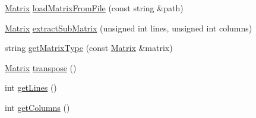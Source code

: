 \begin{DoxyCompactItemize}
\hyperlink{class_matrix}{Matrix} \hyperlink{class_matrix_aeef502e91c5f815b9a99525c0c55f741}{load\-Matrix\-From\-File} (const string \&path)
\item 
\hyperlink{class_matrix}{Matrix} \hyperlink{class_matrix_aeaa460b51a3e8ba810c4caa86427429b}{extract\-Sub\-Matrix} (unsigned int lines, unsigned int columns)
\item 
string \hyperlink{class_matrix_a0a730222578ce4b86e2166dfe8d402d2}{get\-Matrix\-Type} (const \hyperlink{class_matrix}{Matrix} \&matrix)
\item 
\hyperlink{class_matrix}{Matrix} \hyperlink{class_matrix_ae23f817021383e3c8636a714dcba1d21}{transpose} ()
\item 
int \hyperlink{class_matrix_acc315708bcdb54795a686b91277f5bdf}{get\-Lines} ()
\item 
int \hyperlink{class_matrix_a324b4057cd6e2167687e406abd720020}{get\-Columns} ()
\end{DoxyCompactItemize}
